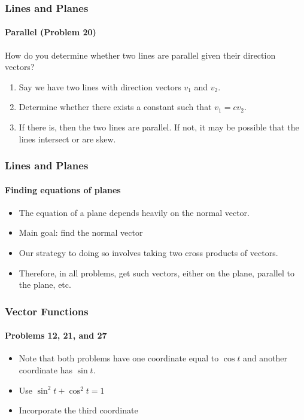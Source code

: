 \documentclass[xcolor=svgnames]{beamer}
\begin{document}
\begin{frame}
\frametitle{Lines and Planes}
\framesubtitle{Parallel (Problem 20)}
How do you determine whether two lines are parallel given their direction vectors? 
\begin{enumerate}
\item Say we have two lines with direction vectors $v_1$ and $v_2$. 
\item Determine whether there exists a constant such that $v_1 = c v_2$. 
\item If there is, then the two lines are parallel. If not, it may be possible that the lines intersect or are skew. 
\end{enumerate}


\end{frame}
\begin{frame}
\frametitle{Lines and Planes}
\framesubtitle{Finding equations of planes}
\begin{itemize}
	\item The equation of a plane depends heavily on the normal vector.
	\item Main goal: find the normal vector
	\item Our strategy to doing so involves taking two cross products of vectors.
	\item Therefore, in all problems, get such vectors, either on the plane, parallel to the plane, etc.
\end{itemize}
\end{frame}

\begin{frame}
\frametitle{Vector Functions}
\framesubtitle{Problems 12, 21, and 27}
\begin{itemize}
\item Note that both problems have one coordinate equal to $\cos t$ and another coordinate has $\sin t$. 
\item Use $\sin^2 t + \cos ^2 t = 1$ 
\item Incorporate the third coordinate
\end{itemize}
\end{frame}
\end{document}
